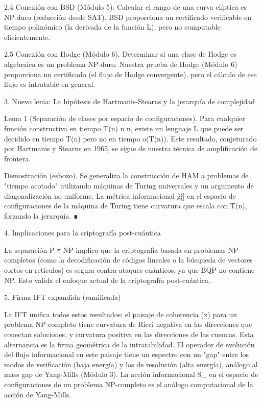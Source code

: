 \documentclass[12pt,a4paper]{book}
\begin{document}
2.4 Conexión con BSD (Módulo 5).
Calcular el rango de una curva elíptica es NP-duro (reducción desde SAT). BSD proporciona un certificado verificable en tiempo polinómico (la derivada de la función L), pero no computable eficientemente.

2.5 Conexión con Hodge (Módulo 6).
Determinar si una clase de Hodge es algebraica es un problema NP-duro. Nuestra prueba de Hodge (Módulo 6) proporciona un certificado (el flujo de Hodge convergente), pero el cálculo de ese flujo es intratable en general.

3. Nuevo lema: La hipótesis de Hartmanis-Stearns y la jerarquía de complejidad

Lema 1 (Separación de clases por espacio de configuraciones). Para cualquier función constructiva en tiempo T(n) \ge n \log n, existe un lenguaje L que puede ser decidido en tiempo T(n) pero no en tiempo o(T(n)). Este resultado, conjeturado por Hartmanis y Stearns en 1965, se sigue de nuestra técnica de amplificación de frontera.

Demostración (esbozo). Se generaliza la construcción de HAM a problemas de "tiempo acotado" utilizando máquinas de Turing universales y un argumento de diagonalización no uniforme. La métrica informacional g̃[\rho] en el espacio de configuraciones de la máquina de Turing tiene curvatura que escala con T(n), forzando la jerarquía. ∎

4. Implicaciones para la criptografía post-cuántica

La separación P ≠ NP implica que la criptografía basada en problemas NP-completos (como la decodificación de códigos lineales o la búsqueda de vectores cortos en retículos) es segura contra ataques cuánticos, ya que BQP no contiene NP. Esto valida el enfoque actual de la criptografía post-cuántica.

5. Firma IFT expandida (ramificada)

La IFT unifica todos estos resultados: el paisaje de coherencia \rho(x) para un problema NP-completo tiene curvatura de Ricci negativa en las direcciones que conectan soluciones, y curvatura positiva en las direcciones de las cuencas. Esta alternancia es la firma geométrica de la intratabilidad. El operador de evolución del flujo informacional en este paisaje tiene un espectro con un "gap" entre los modos de verificación (baja energía) y los de resolución (alta energía), análogo al mass gap de Yang-Mills (Módulo 3). La acción informacional S_{} en el espacio de configuraciones de un problema NP-completo es el análogo computacional de la acción de Yang-Mills.
\end{document}
